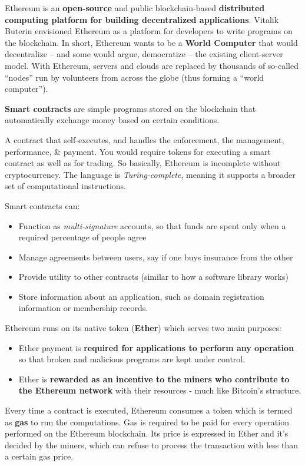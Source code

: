 Ethereum is an \textbf{open-source} and public blockchain-based \textbf{distributed computing platform for building decentralized applications}. Vitalik Buterin envisioned Ethereum as a platform for developers to write programs on the blockchain. In short, Ethereum wants to be a \textbf{World Computer} that would decentralize – and some would argue, democratize – the existing client-server model. With Ethereum, servers and clouds are replaced by thousands of so-called ``nodes'' run by volunteers from across the globe (thus forming a ``world computer'').

\textbf{Smart contracts} are simple programs stored on the blockchain that automatically exchange money based on certain conditions.

A contract that self-executes, and handles the enforcement, the management, performance, \& payment. You would require tokens for executing a smart contract as well as for trading. So basically, Ethereum is incomplete without cryptocurrency. The language is \textit{Turing-complete}, meaning it supports a broader set of computational instructions.

Smart contracts can:
\begin{itemize}
	\item Function as \textit{multi-signature} accounts, so that funds are spent only when a required percentage of people agree
	\item Manage agreements between users, say if one buys insurance from the other
	\item Provide utility to other contracts (similar to how a software library works)
	\item Store information about an application, such as domain registration information or membership records.
\end{itemize}

Ethereum runs on its native token (\textbf{Ether}) which serves two main purposes:
\begin{itemize}
	\item Ether payment is \textbf{required for applications to perform any operation} so that broken and malicious programs are kept under control.
	\item Ether is \textbf{rewarded as an incentive to the miners who contribute to the Ethereum network} with their resources - much like Bitcoin's structure.
\end{itemize}

Every time a contract is executed, Ethereum consumes a token which is termed as \textbf{gas} to run the computations. Gas is required to be paid for every operation performed on the Ethereum blockchain. Its price is expressed in Ether and it's decided by the miners, which can refuse to process the transaction with less than a certain gas price.

